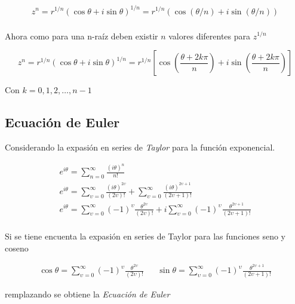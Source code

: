         \begin{gather*}
            z^{n} = r^{1/n}\left(\cos\theta + i\sin\theta\right)^{1/n} = r^{1/n}(\cos{(\theta/n)}+ i\sin{(\theta/n)})\\
        \end{gather*}

        Ahora como para una n-raíz deben existir $n$ valores diferentes para $z^{1/n}$

        \begin{equation*}
            z^{n} = r^{1/n}\left(\cos\theta + i\sin\theta\right)^{1/n} = r^{1/n}\left[\cos\left(\frac{\theta + 2k\pi}{n}\right) + i \sin\left(\frac{\theta + 2k\pi}{n}\right)\right]
        \end{equation*}

        Con $k = 0,1,2, \dots, n-1$ 

    \subsection{Ecuación de Euler}

        Considerando la expasión en series de \textit{Taylor} para la función exponencial.

        \begin{gather*}
            e^{i\theta} = \sum_{n = 0}^{\infty} \frac{(i\theta)^n}{n!}\\
            e^{i\theta} = \sum_{\upsilon = 0}^{\infty} \frac{(i\theta)^{2\upsilon}}{(2\upsilon)!} + \sum_{\upsilon = 0}^{\infty} \frac{(i\theta)^{2\upsilon+1}}{(2\upsilon+1)!}\\
            e^{i\theta} = \sum_{\upsilon = 0}^{\infty} (-1)^{\upsilon}\frac{\theta^{2\upsilon}}{(2\upsilon)!} + i\sum_{\upsilon = 0}^{\infty} (-1)^{\upsilon}\frac{\theta^{2\upsilon+1}}{(2\upsilon+1)!}\\
        \end{gather*}

        Si se tiene encuenta la expasión en series de Taylor para las funciones seno y coseno

        \begin{align*}
            \cos\theta = \sum_{\upsilon = 0}^{\infty} (-1)^{\upsilon}\frac{\theta^{2\upsilon}}{(2\upsilon)!} && \sin\theta = \sum_{\upsilon = 0}^{\infty} (-1)^{\upsilon}\frac{\theta^{2\upsilon+1}}{(2\upsilon+1)!}
        \end{align*}

        remplazando se obtiene la \textit{Ecuación de Euler} 

